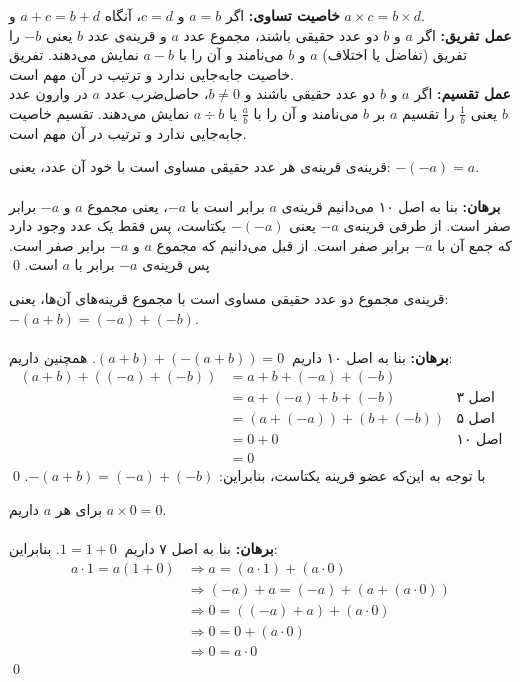 \vspace{1mm}
\noindent
\textbf{خاصیت تساوی:}
اگر
$a=b$ و $c=d$،
آنگاه
$a+c=b+d$ و $a \times c=b \times d$.
\\
\textbf{عمل تفریق:}
اگر $a$ و $b$ دو عدد حقیقی باشند، مجموع عدد $a$ و قرینه‌ی عدد $b$ یعنی $-b$ را تفریق (تفاضل یا اختلاف) $a$ و $b$ می‌نامند و آن را با
$a-b$
نمایش می‌دهند. تفریق خاصیت جابه‌جایی ندارد و ترتیب در آن مهم است.
\\
\textbf{عمل تقسیم:}
اگر $a$ و $b$ دو عدد حقیقی باشند و
$b \neq 0$،
حاصل‌ضرب عدد $a$ در وارون عدد $b$ یعنی
$\frac{1}{b}$
را تقسیم $a$ بر $b$ می‌نامند و آن را با
$\frac{a}{b}$ یا $a \div b$
نمایش می‌دهند. تقسیم خاصیت جابه‌جایی ندارد و ترتیب در آن مهم است.
\vspace{2pt}
\begin{theorem}
	قرینه‌ی قرینه‌ی هر عدد حقیقی مساوی است با خود آن عدد، یعنی:
	$-(-a)=a$.
	\\ \dfth \\ \textbf{برهان:}
	بنا به اصل ۱۰ می‌دانیم قرینه‌ی $a$ برابر است با $-a$، یعنی مجموع $a$ و $-a$ برابر صفر است. از طرفی قرینه‌ی $-a$ یعنی	$-(-a)$ یکتاست، پس فقط یک عدد وجود دارد که جمع آن با $-a$ برابر صفر است. از قبل می‌دانیم که مجموع $a$ و $-a$ برابر صفر است. پس قرینه‌ی $-a$ برابر با $a$ است.
	\qed
\end{theorem}

\begin{theorem}
	قرینه‌ی مجموع دو عدد حقیقی مساوی است با مجموع قرینه‌های آن‌ها، یعنی:
	$-(a+b)=(-a)+(-b)$.
	\\ \dfth \\ \textbf{برهان:}
	بنا به اصل ۱۰ داریم
	$(a+b)+(-(a+b))=0 \ $.
	همچنین داریم:
	\begin{align*}
		(a+b)+((-a)+(-b)) &= a+b+(-a)+(-b) \\
		&= a+(-a)+b+(-b) &\text{اصل ۳} \\
		&= (a+(-a))+(b+(-b)) &\text{اصل ۵} \\
		&= 0+0 &\text{اصل ۱۰} \\
		&= 0
	\end{align*}
	با توجه به این‌که عضو قرینه یکتاست، بنابراین:
	$-(a+b)=(-a)+(-b)$.
	\qed
\end{theorem}

\begin{theorem} \label{nuthat0=0}
	برای هر $a$ داریم
	$a \times 0 = 0$.
	\\ \dfth \\ \textbf{برهان:}
	بنا به اصل ۷ داریم
	$1=1+0 \ $.
	بنابراین:
	\begin{align*}
		a \cdot 1 = a(1+0) &\Rightarrow a = (a \cdot 1) + (a \cdot 0) \\
		&\Rightarrow (-a)+a=(-a)+(a+ (a \cdot 0)) \\
		&\Rightarrow 0 = ((-a)+a)+(a \cdot 0) \\
		&\Rightarrow 0 = 0 + (a \cdot 0) \\
		&\Rightarrow 0 = a \cdot 0
	\end{align*}
	\qed
\end{theorem}

